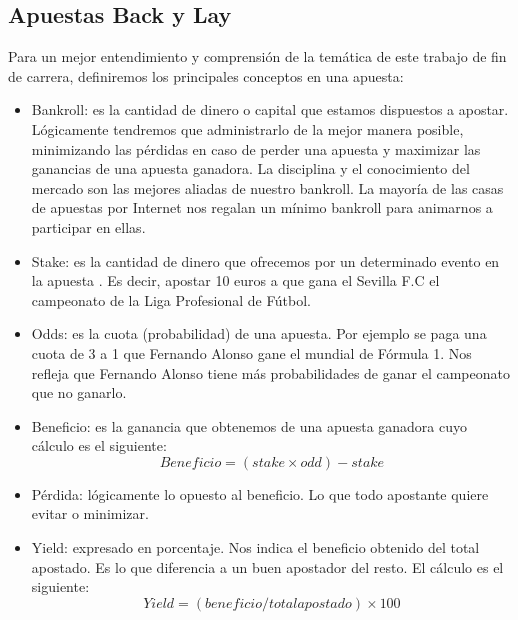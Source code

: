  \subsection{Apuestas Back y Lay}
 
   Para un mejor entendimiento y comprensión de la temática de este trabajo de fin de carrera, definiremos los principales conceptos en una apuesta:
 \begin{itemize}
 \item Bankroll: es la cantidad de dinero o capital  que estamos dispuestos a apostar. Lógicamente tendremos que administrarlo de la mejor manera posible, minimizando las pérdidas en caso de perder una apuesta y maximizar las ganancias de una apuesta ganadora. La disciplina y el conocimiento del mercado son las mejores aliadas de nuestro bankroll. La mayoría de las casas de apuestas por Internet nos regalan un mínimo bankroll para animarnos a participar en ellas.
 \item Stake: es la cantidad de dinero que ofrecemos por un determinado evento en la apuesta . Es decir, apostar 10 euros a que gana el Sevilla F.C el campeonato de la Liga Profesional de Fútbol.
 \item Odds: es la cuota (probabilidad) de una apuesta. Por ejemplo se paga una cuota de 3 a 1 que Fernando Alonso gane el mundial de Fórmula 1. Nos refleja que Fernando Alonso tiene más probabilidades de ganar el campeonato que no ganarlo.
 \item Beneficio: es la ganancia que obtenemos de una apuesta ganadora cuyo cálculo es el siguiente:
 \begin{displaymath}
 Beneficio = (stake \times odd) - stake 
\end{displaymath}

%
%

\item Pérdida: lógicamente lo opuesto al beneficio. Lo que todo apostante quiere evitar o minimizar. 
\item Yield: expresado en porcentaje. Nos indica el beneficio obtenido del total apostado. Es lo que diferencia a un buen apostador del resto. El cálculo es el siguiente:
\begin{displaymath}
 Yield = (beneficio / total apostado) \times 100 
\end{displaymath}
\end{itemize} 


